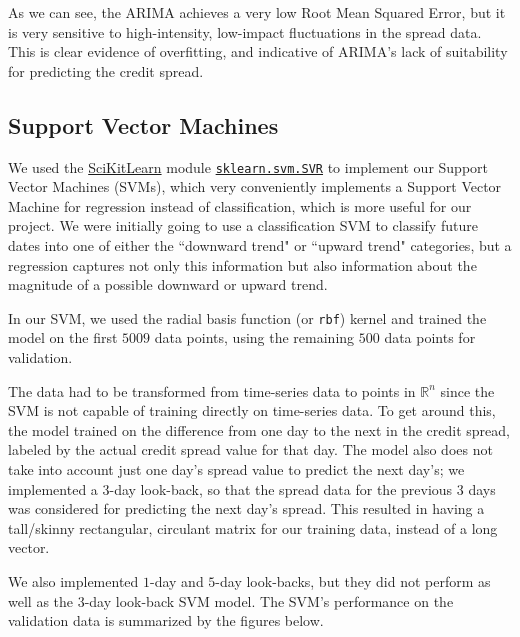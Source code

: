 \documentclass[12pt]{article}
\begin{document}
        As we can see, the ARIMA achieves a very low Root Mean Squared Error, but it is very sensitive to high-intensity, low-impact fluctuations in the spread data.
        This is clear evidence of overfitting, and indicative of ARIMA's lack of suitability for predicting the credit spread.

    \subsection{Support Vector Machines}
    We used the \href{https://scikit-learn.org/stable/index.html}{SciKitLearn} module
    \href{https://scikit-learn.org/stable/modules/generated/sklearn.svm.SVR.html}{\texttt{sklearn.svm.SVR}} to implement our Support Vector Machines (SVMs),
    which very conveniently implements a Support Vector Machine for regression instead of classification, which is more useful for our project.
    We were initially going to use a classification SVM to classify future dates into one of either the ``downward trend" or ``upward trend" categories,
    but a regression captures not only this information but also information about the magnitude of a possible downward or upward trend.

    In our SVM, we used the radial basis function (or \texttt{rbf}) kernel and trained the model on the first $5009$ data points,
    using the remaining $500$ data points for validation.

    The data had to be transformed from time-series data to points in $\mathbb{R}^n$ since the SVM is not capable of training directly on time-series data.
    To get around this, the model trained on the difference from one day to the next in the credit spread, labeled by the actual credit spread value for that day.
    The model also does not take into account just one day's spread value to predict the next day's;
    we implemented a $3$-day look-back, so that the spread data for the previous $3$ days was considered for predicting the next day's spread.
    This resulted in having a tall/skinny rectangular, circulant matrix for our training data, instead of a long vector.

    We also implemented $1$-day and $5$-day look-backs, but they did not perform as well as the $3$-day look-back SVM model.
    The SVM's performance on the validation data is summarized by the figures below.
\end{document}
